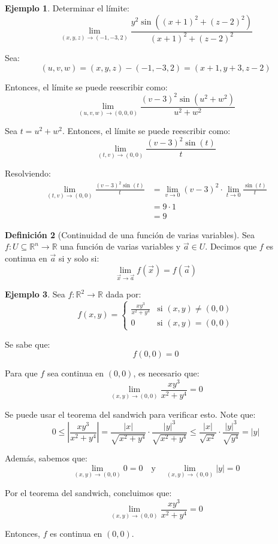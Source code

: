 \documentclass{article}
\newcommand{\R}{\mathbb{R}}
\newcommand{\vect}[1]{\vec{#1}}
\theoremstyle{definition}
\newtheorem{definition}{Definición}[section]
\newtheorem{example}[definition]{Ejemplo}
\theoremstyle{plain}
\theoremstyle{remark}
\theoremstyle{corollary}
\begin{document}
\begin{example}
Determinar el límite:
\[
\lim_{(x, y, z) \to (-1, -3, 2)} \frac{y^2 \sin((x + 1)^2 + (z - 2)^2)}{(x + 1)^2 + (z - 2)^2}
\]

Sea:
\[
(u, v, w) = (x, y, z) - (-1, -3, 2) = (x + 1, y + 3, z - 2)
\]

Entonces, el límite se puede reescribir como:
\[
\lim_{(u, v, w) \to (0, 0, 0)} \frac{(v - 3)^2 \sin(u^2 + w^2)}{u^2 + w^2}
\]

Sea $t = u^2 + w^2$. Entonces, el límite se puede reescribir como:
\[
\lim_{(t, v) \to (0, 0)} \frac{(v - 3)^2 \sin(t)}{t}
\]

Resolviendo:
\begin{align*}
\lim_{(t, v) \to (0, 0)} \frac{(v - 3)^2 \sin(t)}{t} &= \lim_{v \to 0} (v - 3)^2 \cdot \lim_{t \to 0} \frac{\sin(t)}{t} \\
&= 9 \cdot 1 \\
&= 9
\end{align*}

\end{example}

\begin{definition}[Continuidad de una función de varias variables]
Sea $f : U \subseteq \R^n \to \R$ una función de varias variables y $\vect{a} \in U$. Decimos que $f$ es continua en $\vect{a}$ si y solo si:
\[
\lim_{\vect{x} \to \vect{a}} f(\vect{x}) = f(\vect{a})
\]

\end{definition}

\begin{example}
Sea $f : \R^2 \to \R$ dada por:
\[
f(x, y) = \begin{cases}
\frac{x y^3}{x^2 + y^4} & \text{si } (x, y) \neq (0, 0) \\
0 & \text{si } (x, y) = (0, 0)
\end{cases}
\]

Se sabe que:
\[
f(0, 0) = 0
\]

Para que $f$ sea continua en $(0, 0)$, es necesario que:
\[
\lim_{(x, y) \to (0, 0)} \frac{x y^3}{x^2 + y^4} = 0
\]

Se puede usar el teorema del sandwich para verificar esto. Note que:
\[
0 \leq \left| \frac{x y^3}{x^2 + y^4} \right| = \frac{|x|}{\sqrt{x^2 + y^4}} \cdot \frac{|y|^3}{\sqrt{x^2 + y^4}} \leq \frac{|x|}{\sqrt{x^2}} \cdot \frac{|y|^3}{\sqrt{y^4}} = |y|
\]

Además, sabemos que:
\[
\lim_{(x, y) \to (0, 0)} 0 = 0 \quad \text{y} \quad \lim_{(x, y) \to (0, 0)} |y| = 0
\]

Por el teorema del sandwich, concluimos que:
\[
\lim_{(x, y) \to (0, 0)} \frac{x y^3}{x^2 + y^4} = 0
\]

Entonces, $f$ es continua en $(0, 0)$.

\end{example}
\end{document}
